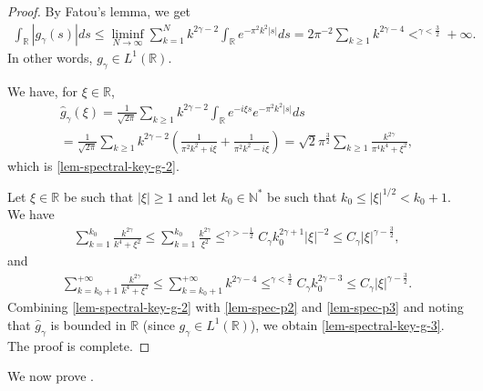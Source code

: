 \documentclass[11pt, reqno]{amsart}
\theoremstyle{plain}
\numberwithin{equation}{section}
\newcommand{\mR}{\mathbb{R}}
\newcommand{\mN}{\mathbb{N}}
\begin{document}
\begin{proof}
By Fatou's lemma, we get
\begin{align*}
	\int_{\mR} |g_{\gamma}(s)| ds 	\leq \liminf_{N \to \infty} \sum_{k = 1}^N  k^{2 \gamma - 2} \int_{\mR} e^{- \pi^2 k^2 |s|} ds = 2 \pi^{-2} \sum_{k \geq 1} k^{2\gamma - 4} \mathop{<}^{\gamma < \frac{3}{2}} +\infty. 
\end{align*}
In other words, $g_\gamma \in L^1(\mR)$. 

We have, for $\xi \in \mR$,
\begin{multline*}
	\hat{g}_{\gamma}(\xi) = \frac{1}{\sqrt{2 \pi}} \sum_{k \geq 1} k^{2\gamma - 2} \int_{\mR} e^{- i \xi s} e^{- \pi^2 k^2 |s|} ds \\
	 = \frac{1}{\sqrt{2 \pi}} \sum_{k \geq 1} k^{2 \gamma - 2} \left(\frac{1}{\pi^2 k^2 + i \xi } + \frac{1}{\pi^2 k^2 - i \xi}  \right) = \sqrt{2}\pi^{\frac{3}{2}} \sum_{k \geq 1} \frac{k^{2 \gamma}}{\pi^4 k^4 + \xi^2},  %
\end{multline*} 
which is \eqref{lem-spectral-key-g-2}. 

Let $\xi \in \mR $ be such that $|\xi| \geq 1$ and let $k_0 \in \mN^*$ be such that $k_0 \leq |\xi|^{1/2} < k_0 + 1$. We have
\begin{align} \label{lem-spec-p2}
\sum_{k=1}^{k_0} \frac{k^{2 \gamma}}{k^4 + \xi^2} \leq  \sum_{k=1}^{k_0} \frac{k^{2 \gamma}}{\xi^2}   \mathop{\leq}^{\gamma > -\frac{1}{2}} C_{\gamma} k_0^{2 \gamma + 1} |\xi|^{-2} \leq C_{\gamma} |\xi|^{\gamma - \frac{3}{2}}, 
\end{align}
and
\begin{align}  \label{lem-spec-p3}
\sum_{k = k_0 + 1}^{+\infty} \frac{k^{2 \gamma}}{k^4 + \xi^2} \leq    \sum_{k = k_0 + 1}^{+\infty} k^{2 \gamma-4} \mathop{\leq}^{\gamma < \frac{3}{2}} C_{\gamma} k_0^{2\gamma - 3} \leq C_{\gamma} |\xi|^{\gamma - \frac{3}{2}}. 
\end{align}
Combining \eqref{lem-spectral-key-g-2} with \eqref{lem-spec-p2} and \eqref{lem-spec-p3} and noting that $\hat{g}_{\gamma}$ is bounded in $\mR$ (since $g_{\gamma} \in L^1(\mR)$), we obtain \eqref{lem-spectral-key-g-3}. The proof is complete. 
\end{proof}


We now prove .
\end{document}
